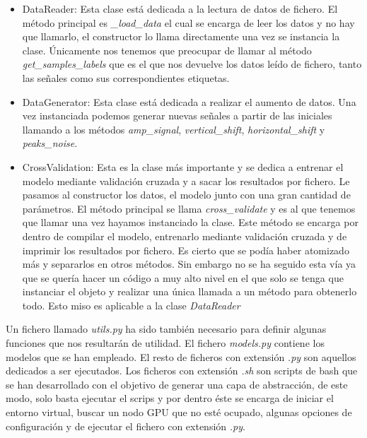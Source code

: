     \begin{itemize}
        \item DataReader: Esta clase está dedicada a la lectura de datos de fichero. El método principal es \textit{\_load\_data} el cual se encarga de leer los datos y no hay que llamarlo, el constructor lo llama directamente una vez se instancia la clase. Únicamente nos tenemos que preocupar de llamar al método \textit{get\_samples\_labels} que es el que nos devuelve los datos leído de fichero, tanto las señales como sus correspondientes etiquetas. 
        \item DataGenerator: Esta clase está dedicada a realizar el aumento de datos. Una vez instanciada podemos generar nuevas señales a partir de las iniciales llamando a los métodos \textit{amp\_signal}, \textit{vertical\_shift}, \textit{horizontal\_shift} y \textit{peaks\_noise}.
        \item CrossValidation: Esta es la clase más importante y se dedica a entrenar el modelo mediante validación cruzada y a sacar los resultados por fichero. Le pasamos al constructor los datos, el modelo junto con una gran cantidad de parámetros. El método principal se llama \textit{cross\_validate} y es al que tenemos que llamar una vez hayamos instanciado la clase. Este método se encarga por dentro de compilar el modelo, entrenarlo mediante validación cruzada y de imprimir los resultados por fichero. Es cierto que se podía haber atomizado más y separarlos en otros métodos. Sin embargo no se ha seguido esta vía ya que se quería hacer un código a muy alto nivel en el que solo se tenga que instanciar el objeto y realizar una única llamada a un método para obtenerlo todo. Esto miso es aplicable a la clase \textit{DataReader}
    \end{itemize}
    
    
    Un fichero llamado \textit{utils.py} ha sido también necesario para definir algunas funciones que nos resultarán de utilidad. El fichero \textit{models.py} contiene los modelos que se han empleado. El resto de ficheros con extensión \textit{.py} son aquellos dedicados a ser ejecutados. Los ficheros con extensión \textit{.sh} son scripts de bash que se han desarrollado con el objetivo de generar una capa de abstracción, de este modo, solo basta ejecutar el scrips y por dentro éste se encarga de iniciar el entorno virtual, buscar un nodo GPU que no esté ocupado, algunas opciones de configuración y de ejecutar el fichero con extensión \textit{.py}. \\
    

